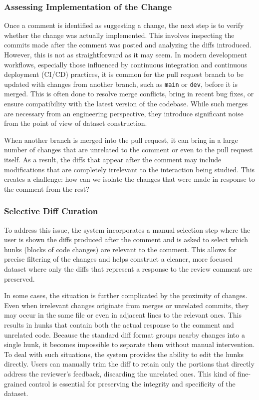\subsubsection{Assessing Implementation of the Change}
Once a comment is identified as suggesting a change, the next step is to verify whether the change
was actually implemented. This involves inspecting the commits made after the comment was posted and
analyzing the diffs introduced. However, this is not as straightforward as it may seem. In modern
development workflows, especially those influenced by continuous integration and continuous
deployment (CI/CD) practices, it is common for the pull request branch to be updated with changes
from another branch, such as \texttt{main} or \texttt{dev}, before it is merged. This is often done
to resolve merge conflicts, bring in recent bug fixes, or ensure compatibility with the latest
version of the codebase. While such merges are necessary from an engineering perspective, they
introduce significant noise from the point of view of dataset construction.

When another branch is merged into the pull request, it can bring in a large number of changes that
are unrelated to the comment or even to the pull request itself. As a result, the diffs that appear
after the comment may include modifications that are completely irrelevant to the interaction being
studied. This creates a challenge: how can we isolate the changes that were made in response to the
comment from the rest?


\subsubsection{Selective Diff Curation}

To address this issue, the system incorporates a manual selection step where the user is shown the
diffs produced after the comment and is asked to select which hunks (blocks of code changes) are
relevant to the comment. This allows for precise filtering of the changes and helps construct a
cleaner, more focused dataset where only the diffs that represent a response to the review comment
are preserved.

In some cases, the situation is further complicated by the proximity of changes. Even when
irrelevant changes originate from merges or unrelated commits, they may occur in the same file or
even in adjacent lines to the relevant ones. This results in hunks that contain both the actual
response to the comment and unrelated code. Because the standard diff format groups nearby changes
into a single hunk, it becomes impossible to separate them without manual intervention. To deal with
such situations, the system provides the ability to edit the hunks directly. Users can manually trim
the diff to retain only the portions that directly address the reviewer’s feedback, discarding the
unrelated ones. This kind of fine-grained control is essential for preserving the integrity and
specificity of the dataset.

